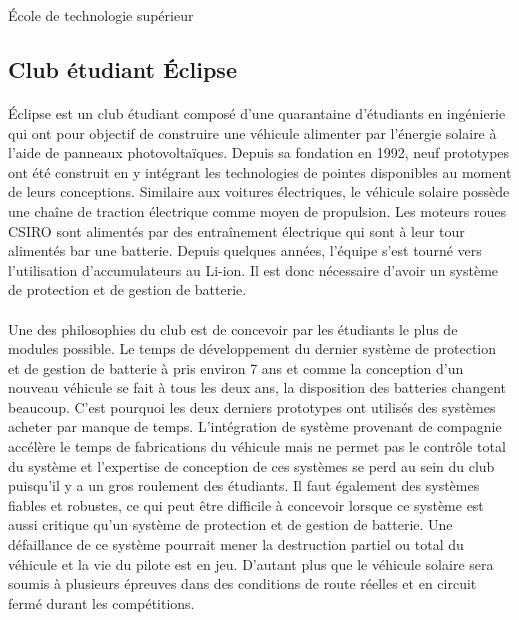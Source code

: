 École de technologie supérieur

\subsection{Club étudiant Éclipse}

\paragraph{}
Éclipse est un club étudiant composé d'une quarantaine d'étudiants en ingénierie qui ont pour objectif de construire une véhicule alimenter par l'énergie solaire à l'aide de panneaux photovoltaïques. Depuis sa fondation en 1992, neuf prototypes ont été construit en y intégrant les technologies de pointes disponibles au moment de leurs conceptions. Similaire aux voitures électriques, le véhicule solaire possède une chaîne de traction électrique comme moyen de propulsion. Les moteurs roues  CSIRO sont alimentés par des entraînement électrique qui sont à leur tour alimentés bar une batterie. Depuis quelques années, l'équipe s'est tourné vers l'utilisation d'accumulateurs au Li-ion. Il est donc nécessaire d'avoir un système de protection et de gestion de batterie.

\paragraph{}
Une des philosophies du club est de concevoir par les étudiants le plus de modules possible. Le temps de développement du dernier système de protection et de gestion de batterie à pris environ 7 ans et comme la conception d'un nouveau véhicule se fait à tous les deux ans, la disposition des batteries changent beaucoup. C'est pourquoi les deux derniers prototypes ont utilisés des systèmes acheter par manque de temps. L'intégration de système provenant de compagnie accélère le temps de fabrications du véhicule mais ne permet pas le contrôle total du système et l'expertise de conception de ces systèmes se perd au sein du club puisqu'il y a un gros roulement des étudiants. Il faut également des systèmes fiables et robustes, ce qui peut être difficile à concevoir lorsque ce système est aussi critique qu'un système de protection et de gestion de batterie. Une défaillance de ce système pourrait mener la destruction partiel ou total du véhicule et la vie du pilote est en jeu. D'autant plus que le véhicule solaire sera soumis à plusieurs épreuves dans des conditions de route réelles et en circuit fermé durant les compétitions.

